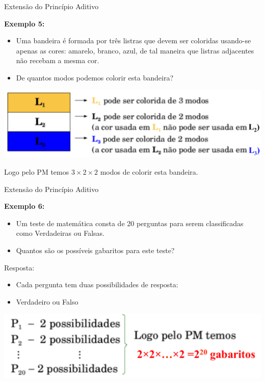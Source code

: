 \documentclass[aspectratio=169]{beamer}
\begin{document}
\begin{frame}{Extensão do Princípio Aditivo}

    \textbf{Exemplo 5:}

\begin{itemize}
    \item Uma bandeira é formada por três listras que devem ser coloridas usando-se apenas as cores: amarelo, branco, azul, de tal maneira que listras adjacentes não recebam a mesma cor.
    \item[] De quantos modos podemos colorir esta bandeira?
\end{itemize}

\begin{center}
    \includegraphics[width=0.9\linewidth]{figs/bandeira.png}
\end{center}

Logo pelo PM temos $3 \times 2 \times 2$ modos de colorir esta bandeira.
\end{frame}

\begin{frame}{Extensão do Princípio Aditivo}

    \textbf{Exemplo 6:}

\begin{itemize}
    \item Um teste de matemática consta de 20 perguntas para
    serem classificadas como Verdadeiras ou Falsas.
    
    \item[] Quantos são os possíveis gabaritos para este teste?
\end{itemize}

\vspace{3mm}
Resposta:

\begin{itemize}
    \item[] Cada pergunta tem duas possibilidades de resposta:
    \item[] Verdadeiro ou Falso 
\end{itemize}

\begin{center}
    \includegraphics[width=0.8\linewidth]{figs/perguntas.png}
\end{center}
\end{frame}
\end{document}
